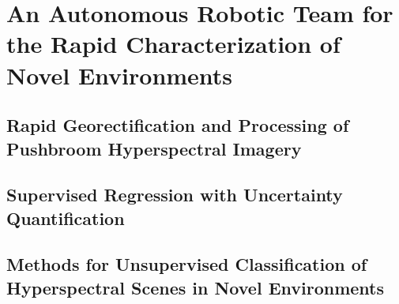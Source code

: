 \chapter{An Autonomous Robotic Team for the Rapid Characterization of Novel Environments}

\section{Rapid Georectification and Processing of Pushbroom Hyperspectral Imagery}
\section{Supervised Regression with Uncertainty Quantification}
\section{Methods for Unsupervised Classification of Hyperspectral Scenes in Novel Environments}



